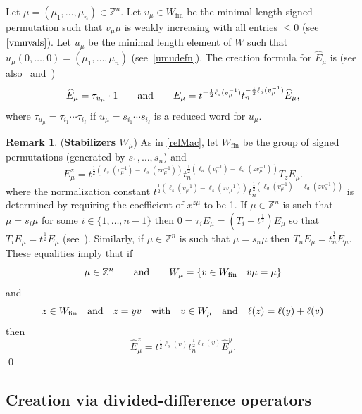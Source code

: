 \documentclass[11pt]{article}
\theoremstyle{plain}
\theoremstyle{definition}
\newtheorem{remark}[thm]{Remark}
\theoremstyle{remark}
\numberwithin{equation}{section}
\def\ZZ{\mathbb{Z}}
\newcounter{r}
\newcounter{s}
\begin{document}
Let $\mu = (\mu_1, \ldots, \mu_n)\in \ZZ^n$.
Let $v_\mu\in W_{\mathrm{fin}}$ be the minimal length signed permutation such that
$v_\mu\mu$ is weakly increasing with all entries $\le0$ (see $\eqref{vmuvals}$).  Let $u_\mu$ be the minimal
length element of $W$ such that $u_\mu(0,\ldots,0) = (\mu_1,\ldots, \mu_n)$ (see~\eqref{umudefn}).
The creation formula for $\widehat{E}_\mu$ is  (see also~\cite[\S4.5]{CR24} and~\cite[(5.101.3)]{Mac03})
\begin{equation}
\widehat{E}_\mu = \tau_{u_\mu} \cdot 1 \qquad\hbox{and}\qquad
E_\mu 
= t^{-\frac12\ell_s(v_\mu^{-1})}t_n^{-\frac12\ell_d(v_\mu^{-1})}
\widehat{E}_\mu,
\label{Ecr}
\end{equation}
where
$\tau_{u_\mu} = \tau_{i_1}\cdots \tau_{i_\ell}$ if $u_\mu = s_{i_1}\cdots s_{i_\ell}$ is a reduced word for $u_\mu$.


\begin{remark} (\textbf{Stabilizers $W_\mu$})
As in 
\eqref{relMac}, let $W_{\mathrm{fin}}$ be the group of signed permutations (generated by $s_1, \ldots, s_n$)
and
$$
E^z_\mu = 
t^{\frac12(\ell_s(v_\mu^{-1})-\ell_s(zv_\mu^{-1}))}t_n^{\frac12(\ell_d(v_\mu^{-1})-\ell_d(zv_\mu^{-1}))}
T_z E_\mu.
$$
where the normalization constant 
$t^{\frac12(\ell_s(v_\mu^{-1})-\ell_s(zv_\mu^{-1}))}t_n^{\frac12(\ell_d(v_\mu^{-1})-\ell_d(zv_\mu^{-1}))}$ 
is determined by requiring the coefficient of $x^{z\mu}$ to be 1.
If $\mu\in \ZZ^n$ is such that $\mu=s_i\mu$ for some $i\in \{1, \ldots, n-1\}$  then 
$0=\tau_i E_\mu = (T_i-t^{\frac12})E_\mu$ so that $T_iE_\mu = t^{\frac12}E_\mu$ (see~\cite[(5.4.2)]{Mac03}).
Similarly, if $\mu\in \ZZ^n$ is such that  $\mu=s_n\mu$ then $T_nE_\mu = t_n^{\frac12}E_\mu$.  
These equalities imply
that if 
$$\mu\in \ZZ^n\qquad\hbox{and}\qquad W_\mu = \{ v\in W_{\mathrm{fin}}\ |\ v\mu=\mu\}$$
and 
$$z\in W_{\mathrm{fin}}\quad\hbox{and}\quad
z=yv\quad\hbox{with}\quad v\in W_\mu\quad\hbox{and}\quad\ell(z)=\ell(y)+\ell(v)$$
then
\begin{equation}
\widehat{E}^z_\mu 
= t^{\frac12\ell_{s}(v)} t_{n}^{\frac{1}{2}\ell_{d}(v)} \widehat{E}^{y}_\mu.
\label{stabfactor}
\end{equation}
\qed
\end{remark}

\subsection{Creation via divided-difference operators}\label{divided different op}
\end{document}
